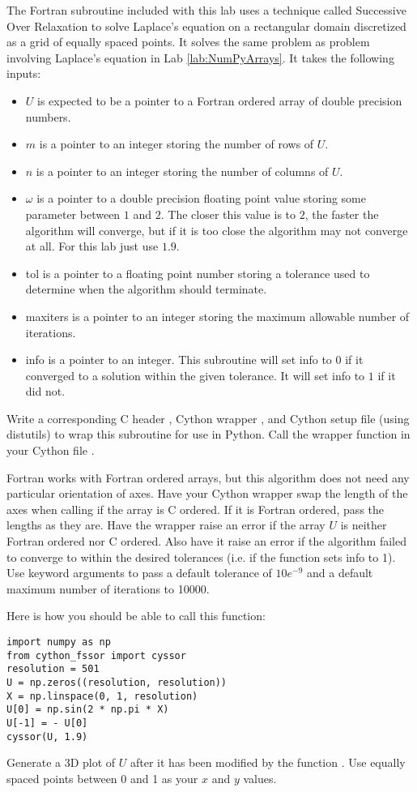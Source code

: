 \begin{problem}
The Fortran subroutine  included with this lab uses a technique called Successive Over Relaxation to solve Laplace's equation on a rectangular domain discretized as a grid of equally spaced points.
It solves the same problem as problem involving Laplace's equation in Lab \ref{lab:NumPyArrays}.
It takes the following inputs:
\begin{itemize}
\item $U$ is expected to be a pointer to a Fortran ordered array of double precision numbers.
\item $m$ is a pointer to an integer storing the number of rows of $U$.
\item $n$ is a pointer to an integer storing the number of columns of $U$.
\item $\omega$ is a pointer to a double precision floating point value storing some parameter between $1$ and $2$.
The closer this value is to $2$, the faster the algorithm will converge, but if it is too close the algorithm may not converge at all.
For this lab just use $1.9$.
\item tol is a pointer to a floating point number storing a tolerance used to determine when the algorithm should terminate.
\item maxiters is a pointer to an integer storing the maximum allowable number of iterations.
\item info is a pointer to an integer.
This subroutine will set info to $0$ if it converged to a solution within the given tolerance.
It will set info to $1$ if it did not.
\end{itemize}

Write a corresponding C header , Cython wrapper , and Cython setup file (using distutils)  to wrap this subroutine for use in Python.
Call the wrapper function in your Cython file .

Fortran works with Fortran ordered arrays, but this algorithm does not need any particular orientation of axes.
Have your Cython wrapper swap the length of the axes when calling  if the array is C ordered.
If it is Fortran ordered, pass the lengths as they are.
Have the wrapper raise an error if the array $U$ is neither Fortran ordered nor C ordered.
Also have it raise an error if the algorithm failed to converge to within the desired tolerances (i.e. if the function sets info to 1).
Use keyword arguments to pass  a default tolerance of $10e^{-9}$ and a default maximum number of iterations to 10000.

Here is how you should be able to call this function:
\begin{lstlisting}
import numpy as np
from cython_fssor import cyssor
resolution = 501
U = np.zeros((resolution, resolution))
X = np.linspace(0, 1, resolution)
U[0] = np.sin(2 * np.pi * X)
U[-1] = - U[0]
cyssor(U, 1.9)
\end{lstlisting}

Generate a 3D plot of $U$ after it has been modified by the function .
Use equally spaced points between 0 and 1 as your $x$ and $y$ values.
\end{problem}

